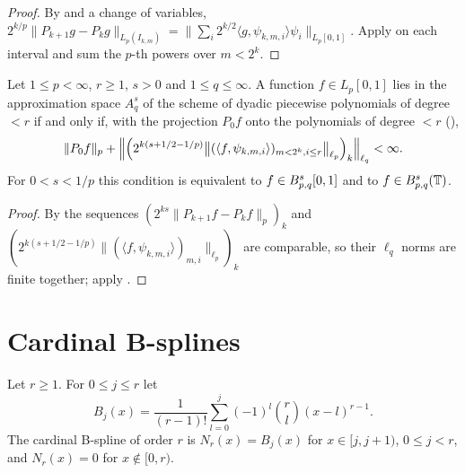 \begin{proof}
\leanok
By  and a change of variables,
$2^{k/p} \|P_{k+1} g - P_k g\|_{L_p(I_{k,m})} = \|\sum_i 2^{k/2} \langle g, \psi_{k,m,i} \rangle
\psi_i\|_{L_p[0,1]}$. Apply  on each interval and sum the $p$-th powers
over $m < 2^k$.
\end{proof}

\begin{theorem}
\label{thm:multiwavelet-besov}
\leanok
{}
Let $1 \leq p < \infty$, $r \geq 1$, $s > 0$ and $1 \leq q \leq \infty$. A function
$f \in L_p[0,1]$ lies in the approximation space $A^s_q$ of the scheme of dyadic piecewise
polynomials of degree $< r$ if and only if, with the projection $P_0 f$ onto the polynomials of
degree $< r$ (),
\[
  \|P_0 f\|_p + \Bigl\| \Bigl( 2^{k(s + 1/2 - 1/p)} \bigl\| (\langle f, \psi_{k,m,i} \rangle)_{m < 2^k,
  i \leq r} \bigr\|_{\ell_p} \Bigr)_k \Bigr\|_{\ell_q} < \infty .
\]
For $0 < s < 1/p$ this condition is equivalent to $f \in B^{s}_{p,q}[0,1]$ and to
$f \in B^{s}_{p,q}(\mathbb{T})$.
\end{theorem}

\begin{proof}
\leanok
By  the sequences $(2^{ks} \|P_{k+1} f - P_k f\|_p)_k$ and
$(2^{k(s + 1/2 - 1/p)} \|(\langle f, \psi_{k,m,i} \rangle)_{m,i}\|_{\ell_p})_k$ are comparable, so
their $\ell_q$ norms are finite together; apply .
\end{proof}

\section{Cardinal B-splines}

\begin{definition}
\label{def:bspline}
\leanok
Let $r \geq 1$. For $0 \leq j \leq r$ let
\[
  B_j(x) = \frac{1}{(r-1)!} \sum_{l = 0}^{j} (-1)^l \binom{r}{l} (x - l)^{r-1} .
\]
The cardinal B-spline of order $r$ is $N_r(x) = B_j(x)$ for $x \in [j, j+1)$, $0 \leq j < r$, and
$N_r(x) = 0$ for $x \notin [0, r)$.
\end{definition}

